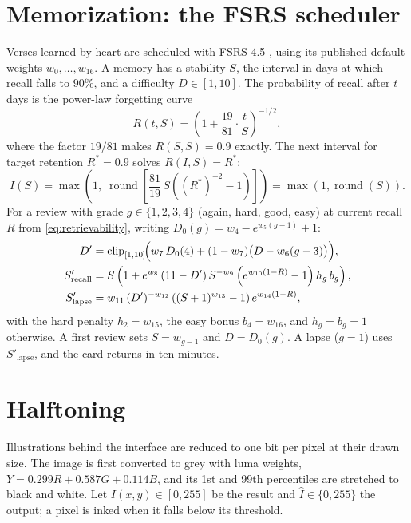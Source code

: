 \documentclass[11pt]{article}
\begin{document}
\section{Memorization: the FSRS scheduler}\label{sec:fsrs}

Verses learned by heart are scheduled with FSRS-4.5 \cite{fsrs}, using its
published default weights $w_0, \dots, w_{16}$. A memory has a stability $S$, the
interval in days at which recall falls to $90\%$, and a difficulty
$D \in [1, 10]$. The probability of recall after $t$ days is the power-law
forgetting curve
\begin{equation}\label{eq:retrievability}
  R(t, S) = \left(1 + \frac{19}{81}\cdot\frac{t}{S}\right)^{-1/2},
\end{equation}
where the factor $19/81$ makes $R(S, S) = 0.9$ exactly. The next interval for
target retention $R^\ast = 0.9$ solves $R(I, S) = R^\ast$:
\begin{equation}
  I(S) = \max\!\left(1,\; \operatorname{round}\!\left[\frac{81}{19}\,S\left((R^\ast)^{-2} - 1\right)\right]\right) = \max(1, \operatorname{round}(S)).
\end{equation}
For a review with grade $g \in \{1, 2, 3, 4\}$ (again, hard, good, easy) at
current recall $R$ from \cref{eq:retrievability}, writing
$D_0(g) = w_4 - e^{w_5(g-1)} + 1$:
\begin{align}
  D' &= \operatorname{clip}_{[1,10]}\!\Bigl(w_7\,D_0(4) + (1 - w_7)\bigl(D - w_6(g - 3)\bigr)\Bigr), \\
  S'_{\text{recall}} &= S\left(1 + e^{w_8}\,(11 - D')\,S^{-w_9}\left(e^{w_{10}(1-R)} - 1\right) h_g\, b_g\right), \\
  S'_{\text{lapse}} &= w_{11}\, (D')^{-w_{12}}\left((S+1)^{w_{13}} - 1\right) e^{w_{14}(1-R)},
\end{align}
with the hard penalty $h_2 = w_{15}$, the easy bonus $b_4 = w_{16}$, and
$h_g = b_g = 1$ otherwise. A first review sets $S = w_{g-1}$ and $D = D_0(g)$. A
lapse ($g = 1$) uses $S'_{\text{lapse}}$, and the card returns in ten minutes.

\section{Halftoning}\label{sec:halftone}

Illustrations behind the interface are reduced to one bit per pixel at their
drawn size. The image is first converted to grey with luma weights,
$Y = 0.299R + 0.587G + 0.114B$, and its 1st and 99th percentiles are stretched
to black and white. Let $I(x, y) \in [0, 255]$ be the result and
$\hat{I} \in \{0, 255\}$ the output; a pixel is inked when it falls below its
threshold.
\end{document}
